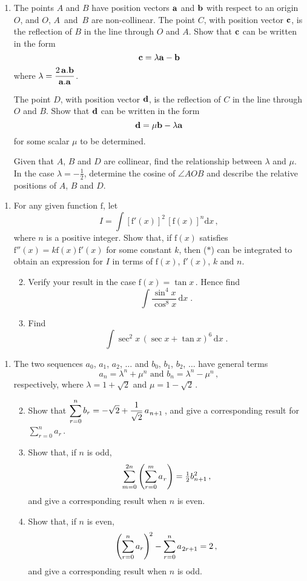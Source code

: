 \documentclass[a4, 11pt]{report}
\newlength{\qspace}
\newcounter{qnumber}
\newenvironment{question}%
 {\vspace{\qspace}
  \begin{enumerate}[\bfseries 1\quad][10]%
    \setcounter{enumi}{\value{qnumber}}%
    \item%
 }
{
  \end{enumerate}
  \filbreak
  \stepcounter{qnumber}
 }
\newenvironment{questionparts}[1][1]%
 {
  \begin{enumerate}[\bfseries (i)]%
    \setcounter{enumii}{#1}
    \addtocounter{enumii}{-1}
    \setlength{\itemsep}{5mm}
    \setlength{\parskip}{8pt}
 }
 {
  \end{enumerate}
 }
\def\d{{\mathrm d}}
\def\f{{\mathrm f}}
\newcommand{\low}{^{\vphantom{()}}}
\begin{document}
\begin{question}
The points  $A$ and $B$ have position vectors $\bf a $ and $\bf b$ 
with respect to an origin $O$, and $O$, $A$~and~$B$ are non-collinear.
The point $C$, with position vector $\bf c$,
 is the reflection of $B$ in the line through
$O$ and $A$. Show that $\bf c$ can be written in the 
form 
\[
\bf c = \lambda \bf a -\bf b
\]
where  $\displaystyle \lambda = \frac{2\,{\bf a .b}}{{\bf a.a}}$.

The point $D$, with position  vector $\bf d$, is the reflection of $C$ in 
the line through $O$ and $B$.
Show that  $\bf d$ can be written in the form
\[
\bf d = \mu\bf b - \lambda \bf a
\]
for some scalar $\mu$ to be determined. 

Given that $A$, $B$ and $D$ are collinear, find the relationship
between $\lambda$ and $\mu$. In the case $\lambda = -\frac12$, determine
the cosine of $\angle AOB$ and describe the relative positions
of $A$, $B$ and $D$.
\end{question}
	
\begin{question}
For any given function $\f$, let
\[
I = \int [\f'(x)]^2 \,[\f(x)]^n \d x\,,
\tag{$*$}
\]
where $n$ is a positive integer.
Show that, if $\f(x)$ satisfies $\f''(x) =k \f(x)\f'(x)$ for some constant
$k$, then ($*$) can be integrated to obtain an expression 
for $I$ in terms of $\f(x)$, $\f'(x)$, $k$ and $n$.  

\begin{questionparts}
\item 
Verify your result in the case $\f(x) = \tan x\,$.
Hence find
\[
\displaystyle \int \frac{\sin^4x}{\cos^{8}x} \, \d x\;.
\]
\item Find
 \[
\displaystyle \int \sec^2x\, (\sec x + \tan x)^6\,\d x\;.
\]
\end{questionparts}
\end{question}
		
\begin{question}
The two sequences $a_0$, $a_1$, $a_2$, $\ldots$
and   
 $b_0$, $b_1$, $b_2$, $\ldots$
have general terms
\[
a_n = \lambda^n +\mu^n
\text { \ \ \ and \ \ \ }
b_n = \lambda^n - \mu^n\,,
\]
respectively, where $\lambda = 1+\sqrt2$ and $\mu= 1-\sqrt2\,$.


\begin{questionparts}
\item Show that $\displaystyle \sum_{r=0}^nb_r = -\sqrt2 + \frac
1 {\sqrt2} \,a_{\low n+1}\,$,
and give a corresponding result for
 $\displaystyle \sum_{r=0}^na_r\,$.
\item Show that, if $n$ is odd,
 $$\sum_{m=0}^{2n}\left( \sum_{r=0}^m a_{\low r}\right) 
= \tfrac12 b_{n+1}^2\,,$$ 
 and give a corresponding result when $n$
is even.
\item Show that, if $n$ is even,
 $$\left(\sum_{r=0}^na_r\right)^{\!2}
 -\sum_{r=0}^n a_{\low 2r+1} =2\,,$$
and give a corresponding result when
$n$ is odd.
\end{questionparts}
\end{question}	
\end{document}
